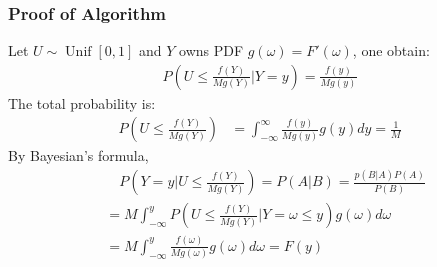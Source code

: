 \begin{frame}
    \pause
    \frametitle{Proof of Algorithm}
    Let \(U \sim \operatorname{Unif}[0,1]\) and \(Y\) owns PDF \(g(\omega) = F'(\omega)\), one obtain:
    \begin{align*}
        P\left(U \leq \frac{f(Y)}{Mg(Y)}\bigg |Y = y  \right) = \frac{f(y)}{Mg(y)}
    \end{align*}
    \pause
    The total probability is:
    \begin{align*}
        P\left(U \leq \frac{f(Y)}{Mg(Y)} \right) &= \int _{-\infty}^\infty\frac{f(y)}{Mg(y)}g(y) dy = \frac 1 M
    \end{align*}
    \pause
    By Bayesian's formula,
    \begin{align*}
        &\quad P\left(Y = y \bigg | U \leq \frac{f(Y)}{Mg(Y)}  \right)= P(A|B) = \frac{p(B|A)P(A)}{P(B)}\\
        &= M\int_{-\infty}^ y  P\left(U \leq \frac{f(Y)}{Mg(Y)}\bigg |Y = \omega \leq y  \right)g(\omega) d \omega\\
        &= M\int_{-\infty}^ y   \frac{f(\omega)}{Mg(\omega)} g(\omega) d\omega = F(y)
    \end{align*}

    

\end{frame}

